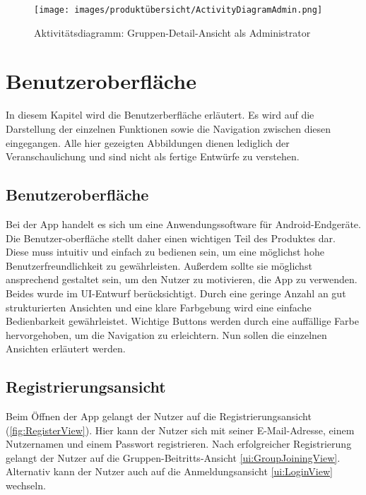 \documentclass[parskip=full]{scrartcl}
\newcommand{\changelocaltocdepth}[1]{%
  \addtocontents{toc}{\protect\setcounter{tocdepth}{#1}}%
  \setcounter{tocdepth}{#1}%
}
\newcommand{\enablesubsectionnumbering}[1]{
    \renewcommand{\thesubsection}{$\langle$#1\arabic{subsection}0$\rangle$}
    \changelocaltocdepth{1} 
}
\begin{document}
\begin{figure}[!htp]
    \centering
    \begin{adjustbox}{right=150mm}
        \texttt{[image: images/produktübersicht/ActivityDiagramAdmin.png]}
    \end{adjustbox}

    \caption{Aktivitätsdiagramm: Gruppen-Detail-Ansicht als Administrator}
    \label{fig:ActivityDiagramAdmin}
\end{figure}
\newpage

\section{ Benutzeroberfläche }
\enablesubsectionnumbering{UI}
In diesem Kapitel wird die Benutzerberfläche erläutert. Es wird auf die Darstellung der einzelnen Funktionen sowie die Navigation zwischen diesen eingegangen. Alle hier gezeigten Abbildungen dienen lediglich der Veranschaulichung und sind nicht als fertige Entwürfe zu verstehen.

\subsection*{Benutzeroberfläche}
Bei der App handelt es sich um eine Anwendungssoftware für Android-Endgeräte. Die Benutzer-oberfläche stellt daher einen wichtigen Teil des Produktes dar. Diese muss intuitiv und einfach zu bedienen sein, um eine möglichst hohe Benutzerfreundlichkeit zu gewährleisten. Außerdem sollte sie möglichst ansprechend gestaltet sein, um den Nutzer zu motivieren, die App zu verwenden. Beides wurde im UI-Entwurf berücksichtigt. Durch eine geringe Anzahl an gut strukturierten Ansichten und eine klare Farbgebung wird eine einfache Bedienbarkeit gewährleistet. Wichtige Buttons werden durch eine auffällige Farbe hervorgehoben, um die Navigation zu erleichtern. Nun sollen die einzelnen Ansichten erläutert werden.

\subsection{Registrierungsansicht}
\label{ui:RegisterView}
Beim Öffnen der App gelangt der Nutzer auf die Registrierungsansicht (\autoref{fig:RegisterView}). Hier kann der Nutzer sich mit seiner E-Mail-Adresse, einem Nutzernamen und einem Passwort registrieren. Nach erfolgreicher Registrierung gelangt der Nutzer auf die Gruppen-Beitritts-Ansicht \ref{ui:GroupJoiningView}. Alternativ kann der Nutzer auch auf die Anmeldungsansicht \ref{ui:LoginView} wechseln.
\end{document}
